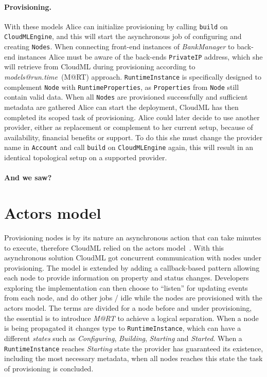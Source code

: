 \paragraph{Provisioning.}
With these models Alice can initialize provisioning by calling 
\texttt{build} on \texttt{CloudMLEngine},
and this will start the asynchronous job of configuring and creating \texttt{Nodes}.
When connecting front-end instances of \emph{BankManager} to back-end instances Alice must 
be aware of the back-ends \texttt{PrivateIP} address, which she will retrieve from CloudML
during provisioning according to \emph{models@run.time}~(M@RT) approach.
\texttt{RuntimeInstance} is specifically designed to complement \texttt{Node} with \texttt{RuntimeProperties},
as \texttt{Properties} from \texttt{Node} still contain valid data.
When all \texttt{Nodes} are provisioned successfully and sufficient metadata are gathered
Alice can start the deployment, CloudML has then completed its scoped task of provisioning.
Alice could later decide to use another provider, either as replacement or complement to her current setup,
because of availability, financial benefits  or support.
To do this she must change the provider name in \texttt{Account} and call \texttt{build} on \texttt{CloudMLEngine} again,
this will result in an identical topological setup on a supported provider.

\paragraph{And we saw?}

\section{Actors model}
Provisioning nodes is by its nature an asynchronous action that can take minutes to execute,
therefore CloudML relied on the actors model~\cite{actors:haller07}.
With this asynchronous solution CloudML got concurrent communication with nodes under provisioning.
The model is extended by adding a callback-based pattern allowing each node to provide 
information on property and status changes.
Developers exploring the implementation can then choose to ``listen'' for updating events from each node,
and do other jobs / idle while the nodes are provisioned with the actors model.
The terms are divided for a node before and under provisioning, the essential is to introduce 
\emph{M@RT} to achieve a logical separation.
When a node is being propagated it changes type to \texttt{RuntimeInstance}, 
which can have a different \emph{states} such as \emph{Configuring}, \emph{Building}, \emph{Starting} and \emph{Started}.
When a \texttt{RuntimeInstance} reaches \emph{Starting} state the provider has guaranteed its existence, including
the most necessary metadata, when all nodes reaches this state the task of provisioning is concluded.
